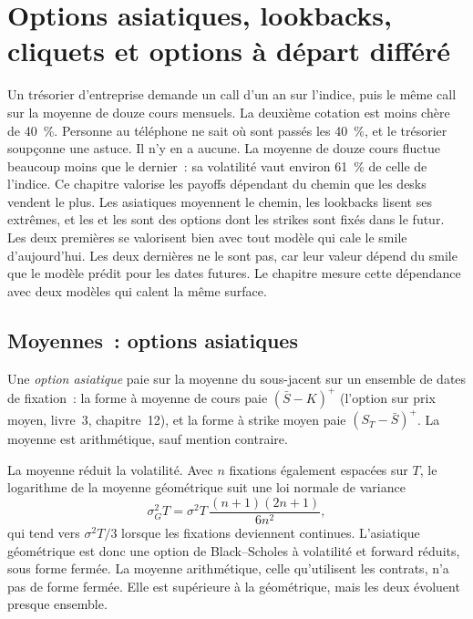 \chapter{Options asiatiques, lookbacks, cliquets et options à départ différé}\label{ch:dv:asians-lookbacks-cliquets-and-forward-starts}

Un trésorier d'entreprise demande un call d'un an sur l'indice, puis le même call sur la moyenne de douze
cours mensuels. La deuxième cotation est moins chère de 40~\%. Personne au téléphone ne sait où sont passés les 40~\%, et le trésorier
soupçonne une astuce. Il n'y en a aucune. La moyenne de douze cours fluctue beaucoup moins que le dernier~: sa volatilité vaut
environ 61~\% de celle de l'indice. Ce chapitre valorise les payoffs dépendant du chemin que les desks vendent le plus. Les asiatiques moyennent le
chemin, les lookbacks lisent ses extrêmes, et les  et les  sont des options dont les strikes sont fixés dans le futur.
Les deux premières se valorisent bien avec tout modèle qui cale le smile d'aujourd'hui. Les deux dernières ne le sont pas, car leur valeur
dépend du smile que le modèle prédit pour les dates futures. Le chapitre mesure cette dépendance avec deux modèles qui
calent la même surface.

\section{Moyennes~: options asiatiques}

\begin{definition}\label{def:dv:asians-lookbacks-cliquets-and-forward-starts:asian}
Une \emph{option asiatique} paie sur la moyenne du sous-jacent sur un ensemble de dates de fixation~: la
forme à moyenne de cours paie $(\bar S-K)^+$ (l'option sur prix moyen, livre~3, chapitre~12), et la forme à strike moyen
paie $(S_T-\bar S)^+$. La moyenne est arithmétique, sauf mention contraire.
\end{definition}

La moyenne réduit la volatilité. Avec $n$ fixations également espacées sur $T$, le logarithme de la moyenne géométrique suit une loi normale
de variance
\[
\sigma_G^2T=\sigma^2T\,\frac{(n+1)(2n+1)}{6n^2},
\]
qui tend vers $\sigma^2T/3$ lorsque les fixations deviennent continues. L'asiatique géométrique est donc une option de Black--Scholes
à volatilité et forward réduits, sous forme fermée. La moyenne arithmétique, celle qu'utilisent les contrats, n'a
pas de forme fermée. Elle est supérieure à la géométrique, mais les deux évoluent presque ensemble.

